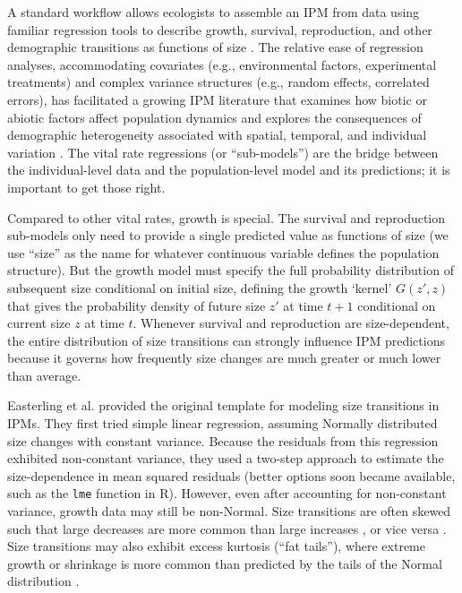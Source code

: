 \documentclass[12pt]{article}
\begin{document}
\begin{spacing}{1.9}
A standard workflow allows ecologists to assemble an IPM from data using familiar regression tools to describe growth, survival, reproduction, and other demographic transitions as functions of size \citep{Coulson:2012fk,ellner-etal-2016}. 
The relative ease of regression analyses, accommodating covariates (e.g., environmental factors, experimental treatments) and complex variance structures (e.g., random effects, correlated errors), has facilitated a growing IPM literature that examines how biotic or abiotic factors affect population dynamics \citep[e.g.,][]{ozgul2010coupled,louthan2022climate} and explores the consequences of demographic heterogeneity associated with spatial, temporal, and individual variation \citep[e.g.,][]{crone2016contrasting,compagnoni2016effect,plard2018sex}. 
The vital rate regressions (or ``sub-models'') are the bridge between the individual-level data and the population-level model and its predictions; it is important to get those right.

Compared to other vital rates, growth is special. 
The survival and reproduction sub-models only need to provide a single predicted value as functions of size (we use ``size'' as the name for whatever continuous variable defines the population structure).   
But the growth model must specify the full probability distribution of subsequent size conditional on initial size, defining the  
growth `kernel' $G(z',z)$ that gives the probability density of future size $z'$ at time $t+1$ conditional on current size $z$ at time $t$. 
Whenever survival and reproduction are size-dependent, the entire distribution of size transitions can strongly influence IPM predictions because it governs how frequently size changes are much greater or much lower than average. 

Easterling et al. \citeyear{easterling2000size} provided the original template for modeling size transitions in IPMs. 
They first tried simple linear regression, assuming Normally distributed size changes with constant variance. 
Because the residuals from this regression exhibited non-constant variance, they used a two-step approach to estimate the size-dependence in mean squared residuals (better options soon became available, such as the \texttt{lme} function in R). 
However, even after accounting for non-constant variance, growth data may still be non-Normal.  
Size transitions are often skewed such that large decreases are more common than large increases \citep{peterson2019improving,salguero2010keeping}, or vice versa \citep{stubberud2019effects}.
Size transitions may also exhibit excess kurtosis (``fat tails''), where extreme growth or shrinkage is more common than predicted by the tails of the Normal distribution \citep{herault2011functional}. 


\end{spacing}
\end{document}
